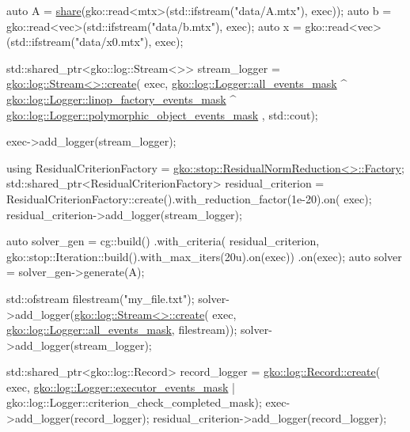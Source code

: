 \begin{DoxyCodeInclude}
    \textcolor{keyword}{auto} A = \hyperlink{namespacegko_a3ce296f73db0ff398bdea6009a3a5c58}{share}(gko::read<mtx>(std::ifstream(\textcolor{stringliteral}{"data/A.mtx"}), exec));
    \textcolor{keyword}{auto} b = gko::read<vec>(std::ifstream(\textcolor{stringliteral}{"data/b.mtx"}), exec);
    \textcolor{keyword}{auto} x = gko::read<vec>(std::ifstream(\textcolor{stringliteral}{"data/x0.mtx"}), exec);

    std::shared\_ptr<gko::log::Stream<>> stream\_logger =
        \hyperlink{classgko_1_1log_1_1Stream_a71f96d3f1cd7c03875476cd8db98145b}{gko::log::Stream<>::create}(
            exec,
            \hyperlink{classgko_1_1log_1_1Logger_a02534863a2d2f92dfeb2c39038365532}{gko::log::Logger::all\_events\_mask} ^
                \hyperlink{classgko_1_1log_1_1Logger_ad6fb77d4d5610bc7299087f7149a7f16}{gko::log::Logger::linop\_factory\_events\_mask} ^
                \hyperlink{classgko_1_1log_1_1Logger_a5fb997f1c06c0602103d8dab616a96bc}{gko::log::Logger::polymorphic\_object\_events\_mask}
      ,
            std::cout);

    exec->add\_logger(stream\_logger);

    \textcolor{keyword}{using} ResidualCriterionFactory =
        \hyperlink{classgko_1_1stop_1_1ResidualNormReduction_1_1Factory}{gko::stop::ResidualNormReduction<>::Factory};
    std::shared\_ptr<ResidualCriterionFactory> residual\_criterion =
        ResidualCriterionFactory::create().with\_reduction\_factor(1e-20).on(
            exec);
    residual\_criterion->add\_logger(stream\_logger);

    \textcolor{keyword}{auto} solver\_gen =
        cg::build()
            .with\_criteria(
                residual\_criterion,
                gko::stop::Iteration::build().with\_max\_iters(20u).on(exec))
            .on(exec);
    \textcolor{keyword}{auto} solver = solver\_gen->generate(A);


    std::ofstream filestream(\textcolor{stringliteral}{"my\_file.txt"});
    solver->add\_logger(\hyperlink{classgko_1_1log_1_1Stream}{gko::log::Stream<>::create}(
        exec, \hyperlink{classgko_1_1log_1_1Logger_a02534863a2d2f92dfeb2c39038365532}{gko::log::Logger::all\_events\_mask}, filestream));
    solver->add\_logger(stream\_logger);

    std::shared\_ptr<gko::log::Record> record\_logger = \hyperlink{classgko_1_1log_1_1Record_ab3863ff409b8ceaefa2f226a4e26debc}{gko::log::Record::create}(
        exec, \hyperlink{classgko_1_1log_1_1Logger_af263708ebb15007bc0086e7c438c190c}{gko::log::Logger::executor\_events\_mask} |
                  gko::log::Logger::criterion\_check\_completed\_mask);
    exec->add\_logger(record\_logger);
    residual\_criterion->add\_logger(record\_logger);


\end{DoxyCodeInclude}
